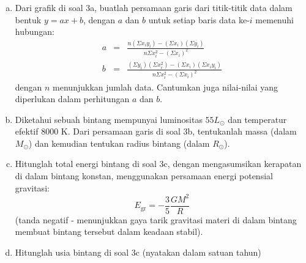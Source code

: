 \documentclass[11pt,fleqn]{exam}
\begin{document}
\begin{questions}
\begin{enumerate}[a.]
    \item Dari grafik di soal 3a, buatlah persamaan garis dari titik-titik data dalam bentuk $y=ax + b$, dengan $a$ dan $b$ untuk setiap baris data ke-$i$ memenuhi hubungan:
    \begin{eqnarray*}
        a &=& \frac{n \left(\Sigma x_i y_i \right) - \left(\Sigma x_i \right)\left(\Sigma y_i \right)}{n\Sigma x_i^2 - \left(\Sigma x_i \right)^2}\\
        b &=&\frac{ \left(\Sigma y_i \right)\left(\Sigma x_i^2 \right) - \left(\Sigma x_i \right) \left(\Sigma x_i y_i \right)}{n\Sigma x_i^2 - \left(\Sigma x_i \right)^2}
    \end{eqnarray*}
    dengan $n$ menunjukkan jumlah data. Cantumkan juga nilai-nilai yang diperlukan dalam perhitungan $a$ dan $b$.

    \item Diketahui sebuah bintang mempunyai luminositas $55L_\odot$ dan temperatur efektif 8000 K. Dari persamaan garis di soal 3b, tentukanlah massa (dalam $M_\odot$) dan kemudian tentukan radius bintang (dalam $R_\odot$).

    \item Hitunglah total energi bintang di soal 3c, dengan mengasumsikan kerapatan di dalam bintang konstan, menggunakan persamaan energi potensial gravitasi:
    \begin{equation*}
        E_\text{gr} = - \frac{3}{5} \frac{GM^2}{R}
    \end{equation*}
    (tanda negatif - menunjukkan gaya tarik gravitasi materi di dalam bintang membuat bintang tersebut dalam keadaan stabil).

    \item Hitunglah usia bintang di soal 3c (nyatakan dalam satuan tahun)
\end{enumerate}



\end{questions}
\end{document}
